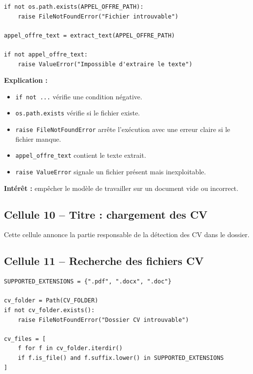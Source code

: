 \documentclass[12pt,a4paper]{article}
\begin{document}
\begin{lstlisting}[style=pythonstyle]
if not os.path.exists(APPEL_OFFRE_PATH):
    raise FileNotFoundError("Fichier introuvable")

appel_offre_text = extract_text(APPEL_OFFRE_PATH)

if not appel_offre_text:
    raise ValueError("Impossible d'extraire le texte")
\end{lstlisting}

\textbf{Explication :}
\begin{itemize}
  \item \texttt{if not ...} vérifie une condition négative.
  \item \texttt{os.path.exists} vérifie si le fichier existe.
  \item \texttt{raise FileNotFoundError} arrête l'exécution avec une erreur claire si le fichier manque.
  \item \texttt{appel\_offre\_text} contient le texte extrait.
  \item \texttt{raise ValueError} signale un fichier présent mais inexploitable.
\end{itemize}

\textbf{Intérêt :} empêcher le modèle de travailler sur un document vide ou incorrect.

\subsection{Cellule 10 -- Titre : chargement des CV}

Cette cellule annonce la partie responsable de la détection des CV dans le dossier.

\subsection{Cellule 11 -- Recherche des fichiers CV}

\begin{lstlisting}[style=pythonstyle]
SUPPORTED_EXTENSIONS = {".pdf", ".docx", ".doc"}

cv_folder = Path(CV_FOLDER)
if not cv_folder.exists():
    raise FileNotFoundError("Dossier CV introuvable")

cv_files = [
    f for f in cv_folder.iterdir()
    if f.is_file() and f.suffix.lower() in SUPPORTED_EXTENSIONS
]
\end{lstlisting}
\end{document}
